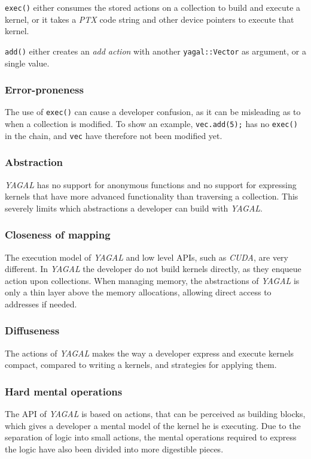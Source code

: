 \texttt{exec()} either consumes the stored actions on a collection to build and execute a kernel, or it takes a \textit{PTX} code string and other device pointers to execute that kernel.

\texttt{add()} either creates an \textit{add action} with another \texttt{yagal::Vector} as argument, or a single value.

\subsubsection[*]{Error-proneness}
The use of \texttt{exec()} can cause a developer confusion, as it can be misleading as to when a collection is modified. To show an example,
\texttt{vec.add(5);} has no \texttt{exec()} in the chain, and \texttt{vec} have therefore not been modified yet.

\subsubsection[*]{Abstraction}
\textit{YAGAL} has no support for anonymous functions and no support for expressing kernels that have more advanced functionality than traversing a collection. This severely limits which abstractions a developer can build with \textit{YAGAL}.

\subsubsection[*]{Closeness of mapping}
The execution model of \textit{YAGAL} and low level APIs, such as \textit{CUDA}, are very different. In \textit{YAGAL} the developer do not build kernels directly, as they enqueue action upon collections. When managing memory, the abstractions of \textit{YAGAL} is only a thin layer above the memory allocations, allowing direct access to addresses if needed.

\subsubsection[*]{Diffuseness}
The actions of \textit{YAGAL} makes the way a developer express and execute kernels compact, compared to writing a kernels, and strategies for applying them.

\subsubsection[*]{Hard mental operations}
The API of \textit{YAGAL} is based on actions, that can be perceived as building blocks, which gives a developer a mental model of the kernel he is executing. Due to the separation of logic into small actions, the mental operations required to express the logic have also been divided into more digestible pieces.

